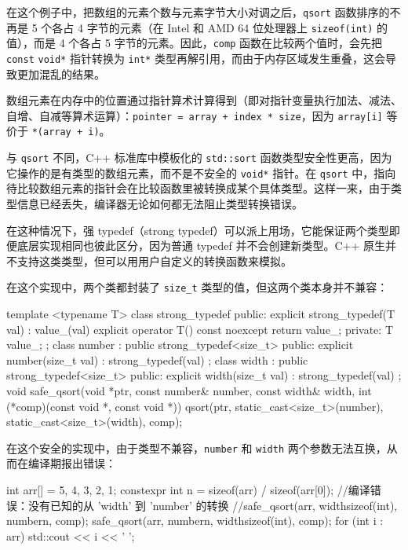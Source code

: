 \label{idx:1002}
在这个例子中，把数组的元素个数与元素字节大小对调之后，\texttt{qsort} 函数排序的不再是 5 个各占 4 字节的元素（在 Intel 和 AMD 64 位处理器上 \texttt{sizeof(\allowbreak{}int)\allowbreak{}} 的值），而是 4 个各占 5 字节的元素。因此，\texttt{comp} 函数在比较两个值时，会先把 \texttt{const} \texttt{void*} 指针转换为 \texttt{int*} 类型再解引用，而由于内存区域发生重叠，这会导致更加混乱的结果。


数组元素在内存中的位置通过指针算术计算得到（即对指针变量执行加法、减法、自增、自减等算术运算）：\texttt{pointer =\allowbreak{} array +\allowbreak{} index * size}，因为 \texttt{array[i]} 等价于 \texttt{*(\allowbreak{}array +\allowbreak{} i)\allowbreak{}}。

\label{idx:1003}
与 \texttt{qsort} 不同，C++ 标准库中模板化的 \texttt{std::sort} 函数类型安全性更高，因为它操作的是有类型的数组元素，而不是不安全的 \texttt{void*} 指针。在 \texttt{qsort} 中，指向待比较数组元素的指针会在比较函数里被转换成某个具体类型。这样一来，由于类型信息已经丢失，编译器无论如何都无法阻止类型转换错误。

在这种情况下，强 typedef（strong typedef）可以派上用场，它能保证两个类型即便底层实现相同也彼此区分，因为普通 typedef 并不会创建新类型。C++ 原生并不支持这类类型，但可以用用户自定义的转换函数来模拟。

在这个实现中，两个类都封装了 \texttt{size\_t} 类型的值，但这两个类本身并不兼容：

\begin{codebox}[cpp]
template <typename T> class strong_typedef {
public:
  explicit strong_typedef(T val) : value_(val) {}
  explicit operator T() const noexcept { return value_; }
private:
  T value_;
};
class number : public strong_typedef<size_t> {
public:
  explicit number(size_t val) : strong_typedef(val) {}
};
class width : public strong_typedef<size_t> {
public:
  explicit width(size_t val) : strong_typedef(val) {}
};
void safe_qsort(void *ptr, const number& number, const width& width,
                int (*comp)(const void *, const void *)) {
  qsort(ptr, static_cast<size_t>(number), static_cast<size_t>(width), comp);
}
\end{codebox}

\label{idx:1004}
在这个安全的实现中，由于类型不兼容，\texttt{number} 和 \texttt{width} 两个参数无法互换，从而在编译期报出错误：

\begin{codebox}[cpp]
int arr[] = {5, 4, 3, 2, 1};
constexpr int n = sizeof(arr) / sizeof(arr[0]);
//编译错误：没有已知的从 'width' 到 'number' 的转换
//safe_qsort(arr, width{sizeof(int)}, number{n}, comp);
safe_qsort(arr, number{n}, width{sizeof(int)}, comp);
for (int i : arr) {
  std::cout << i << ' ';
}
\end{codebox}

